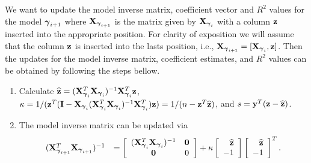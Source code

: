 \documentclass{article}[12pt]
\begin{document}
We want to update the model inverse matrix, coefficient vector and $R^2$ values for the model ${\boldsymbol \gamma}_{i+1}$ where ${\bf X}_{{\boldsymbol \gamma}_{i+1}}$ is the matrix given by ${\bf X}_{{\boldsymbol \gamma}_i}$ with a column ${\bf z}$ inserted into the appropriate position.
For clarity of exposition we will assume that the column ${\bf z}$ is inserted into the lasts position, i.e., ${\bf X}_{{\boldsymbol \gamma}_{i+1}} = [{\bf X}_{{\boldsymbol \gamma}_{i}},{\bf z}]$.
Then the updates for the model inverse matrix, coefficient estimates, and $R^2$ values can be obtained by following the steps bellow.
\begin{enumerate}
	\item Calculate $\widehat{{\bf z}} = ({\bf X}_{{\boldsymbol \gamma}_i}^T{\bf X}_{{\boldsymbol \gamma}_i})^{-1}{\bf X}_{{\boldsymbol \gamma}_i}^T{\bf z}$, 
	$\kappa 
	= 
	1/({\bf z}^T({\bf I} - {\bf X}_{{\boldsymbol \gamma}_i}({\bf X}_{{\boldsymbol \gamma}_i}^T{\bf X}_{{\boldsymbol \gamma}_i})^{-1}{\bf X}_{{\boldsymbol \gamma}_i}^T){\bf z}) 
	= 1/(n - {\bf z}^T\widehat{{\bf z}})$, and  $s = {\bf y}^T({\bf z} - \widehat{{\bf z}})$.
	
	\item The model inverse matrix can be updated via  
	$$
	\begin{array}{rl}
	({\bf X}_{{\boldsymbol \gamma}_{i+1}}^T{\bf X}_{{\boldsymbol \gamma}_{i+1}})^{-1}
	&\displaystyle = 
	\left[ \begin{array}{cc}
	({\bf X}_{{\boldsymbol \gamma}_{i}}^T{\bf X}_{{\boldsymbol \gamma}_{i}})^{-1}    & {\bf 0} \\
	{\bf 0}             
	& 0
	\end{array} \right] + \kappa \left[ \begin{array}{r}
	\widehat{{\bf z}} \\
	-1 \\
	\end{array} \right] \left[ \begin{array}{r}
	\widehat{{\bf z}} \\
	-1 \\
	\end{array} \right]^T.
	\end{array} 
	$$
	

\end{enumerate}
\end{document}
